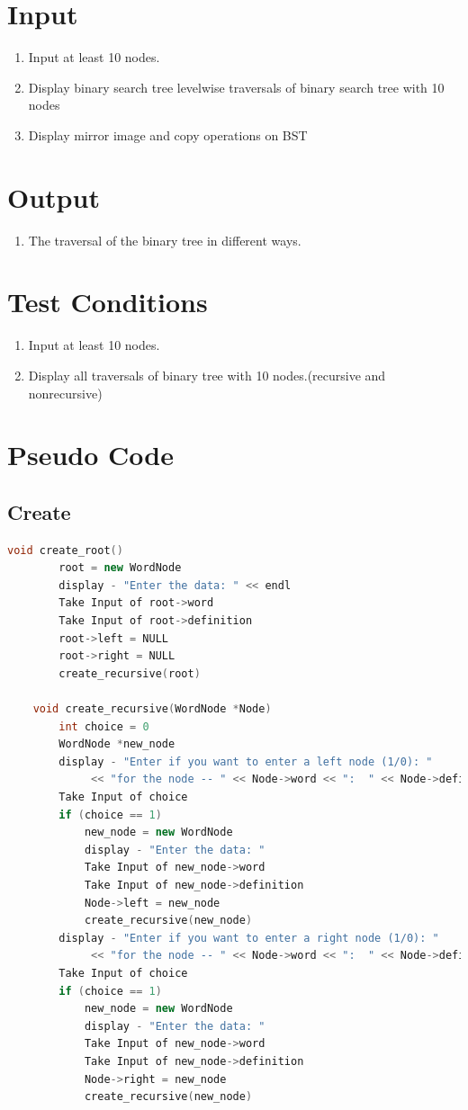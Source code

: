 \documentclass[11pt]{article}
\begin{document}
\section{Input}
\begin{enumerate}
    \item Input at least 10 nodes.
    \item Display binary search tree levelwise traversals of binary search tree with 10 nodes
    \item Display mirror image and copy operations on BST
\end{enumerate}
\section{Output}
\begin{enumerate}
    \item The traversal of the binary tree in different ways.
\end{enumerate}

\section{Test Conditions}
\begin{enumerate}
    \item Input at least 10 nodes.
    \item Display all traversals of binary tree with 10 nodes.(recursive and nonrecursive)
\end{enumerate}

\section{Pseudo Code}
\subsection{Create}
\begin{lstlisting}[language=C++]
	void create_root()
        root = new WordNode
        display - "Enter the data: " << endl
        Take Input of root->word
        Take Input of root->definition
        root->left = NULL
        root->right = NULL
        create_recursive(root)

    void create_recursive(WordNode *Node)
        int choice = 0
        WordNode *new_node
        display - "Enter if you want to enter a left node (1/0): "
             << "for the node -- " << Node->word << ":  " << Node->definition << "-- "
        Take Input of choice
        if (choice == 1)
            new_node = new WordNode
            display - "Enter the data: "
            Take Input of new_node->word
            Take Input of new_node->definition
            Node->left = new_node
            create_recursive(new_node)
        display - "Enter if you want to enter a right node (1/0): "
             << "for the node -- " << Node->word << ":  " << Node->definition << "-- "
        Take Input of choice
        if (choice == 1)
            new_node = new WordNode
            display - "Enter the data: "
            Take Input of new_node->word
            Take Input of new_node->definition
            Node->right = new_node
            create_recursive(new_node)
\end{lstlisting}
\end{document}
